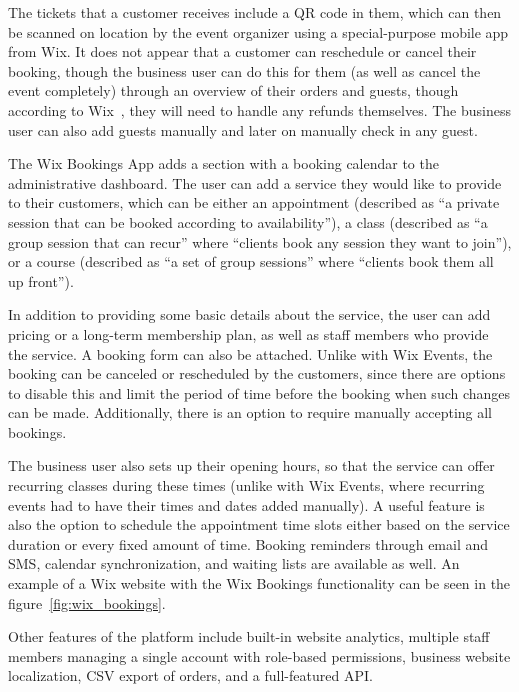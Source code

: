 The tickets that a customer receives include a QR code in them, which can then be scanned on location by the event organizer using a special-purpose mobile app from Wix. It does not appear that a customer can reschedule or cancel their booking, though the business user can do this for them (as well as cancel the event completely) through an overview of their orders and guests, though according to Wix~\cite{wix}, they will need to handle any refunds themselves. The business user can also add guests manually and later on manually check in any guest.

The Wix Bookings App adds a section with a booking calendar to the administrative dashboard. The user can add a service they would like to provide to their customers, which can be either an appointment (described as \enquote{a private session that can be booked according to availability}), a class (described as \enquote{a group session that can recur} where \enquote{clients book any session they want to join}), or a course (described as \enquote{a set of group sessions} where \enquote{clients book them all up front}).

In addition to providing some basic details about the service, the user can add pricing or a long-term membership plan, as well as staff members who provide the service. A booking form can also be attached. Unlike with Wix Events, the booking can be canceled or rescheduled by the customers, since there are options to disable this and limit the period of time before the booking when such changes can be made. Additionally, there is an option to require manually accepting all bookings.

The business user also sets up their opening hours, so that the service can offer recurring classes during these times (unlike with Wix Events, where recurring events had to have their times and dates added manually). A useful feature is also the option to schedule the appointment time slots either based on the service duration or every fixed amount of time. Booking reminders through email and SMS, calendar synchronization, and waiting lists are available as well. An example of a Wix website with the Wix Bookings functionality can be seen in the figure~\ref{fig:wix_bookings}.

Other features of the platform include built-in website analytics, multiple staff members managing a single account with role-based permissions, business website localization, CSV export of orders, and a full-featured API.


